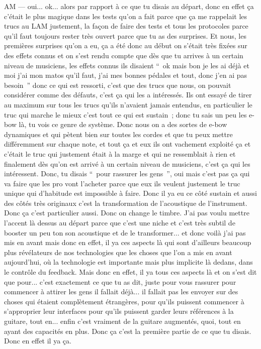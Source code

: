 AM — oui... ok... alors par rapport à ce que tu disais au départ, donc en effet ça c'était le plus magique dans les tests qu'on a fait parce que ça me rappelait les trucs au LAM justement, la façon de faire des tests et tous les protocoles parce qu'il faut toujours rester très ouvert parce que tu as des surprises. Et nous, les premières surprises qu'on a eu, ça a été donc au début on s'était très fixées sur des effets connus et on s'est rendu compte que dès que tu arrives à un certain niveau de musiciens, les effets connus ils disaient “ ok mais bon je les ai déjà et moi j'ai mon matos qu'il faut, j'ai mes bonnes pédales et tout, donc j'en ai pas besoin ” donc ce qui est ressorti, c'est que des trucs que nous, on pouvait considérer comme des défauts, c'est ça qui les a intéressés. Ils ont essayé de tirer au maximum sur tous les trucs qu'ils n'avaient jamais entendus, en particulier le truc qui marche le mieux c'est tout ce qui est sustain ; donc tu sais un peu les \gls{e-bow} là, tu vois ce genre de système. Donc nous on a des sortes de e-bow dynamiques et qui pètent bien sur toutes les cordes et que tu peux mettre différemment sur chaque note, et tout ça et eux ils ont vachement exploité ça et c'était le truc qui justement était à la marge et qui ne ressemblait à rien et finalement dès qu'on est arrivé à un certain niveau de musiciens, c'est ça qui les intéressent. Donc, tu disais “ pour rassurer les gens ”, oui mais c'est pas ça qui va faire que les pro vont l'acheter parce que eux ils veulent justement le truc unique qui d'habitude est impossible à faire. Donc il ya eu ce côté sustain et aussi des côtés très originaux c'est la transformation de l'acoustique de l'instrument. Donc ça c'est particulier aussi. Donc on change le timbre. J'ai pas voulu mettre l'accent là dessus au départ parce que c'est une niche et c'est très subtil de booster un peu ton son acoustique et de le transformer... et donc voilà j'ai pas mis en avant mais donc en effet, il ya ces aspects là qui sont d'ailleurs beaucoup plus révélateurs de nos technologies que les choses que l'on a mis en avant aujourd'hui, où la technologie est importante mais plus implicite là dedans, dans le contrôle du feedback. Mais donc en effet, il ya tous ces aspects là et on s'est dit que pour... c'est exactement ce que tu as dit, juste pour vous rassurer pour commencer à attirer les gens il fallait déjà... il fallait pas les envoyer sur des choses qui étaient complètement étrangères, pour qu'ils puissent commencer à s'approprier leur interfaces pour qu'ils puissent garder leurs références à la guitare, tout en... enfin c'est vraiment de la guitare augmentés, quoi, tout en ayant des capacités en plus. Donc ça c'est la première partie de ce que tu disais. Donc en effet il ya ça. 

